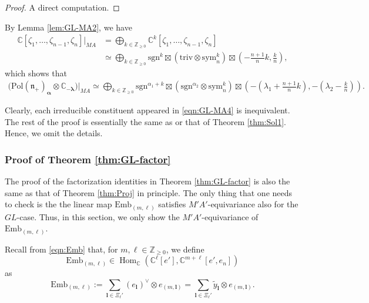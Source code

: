 \documentclass[reqno,11pt]{amsart}
\theoremstyle{remark}
\theoremstyle{definition}
\numberwithin{equation}{section}
\newcommand{\ga}{\alpha}
\newcommand{\fn}{{\mathfrak n}}
\newcommand{\C}{\mathbb{C}}
\newcommand{\Z}{\mathbb{Z}}
\newcommand{\Hom}{\operatorname{Hom}}
\newcommand{\Pol}{\mathrm{Pol}}
\newcommand{\triv}{\mathrm{triv}}
\newcommand{\sym}{\mathrm{sym}}
\newcommand{\sgn}{\mathrm{sgn}}
\newcommand{\balpha}{\bm{\alpha}}
\newcommand{\blambda}{\bm{\lambda}}
\newcommand{\Emb}{\mathrm{Emb}}
\newcommand{\wy}{\widetilde{y}}
\begin{document}
\begin{proof}
A direct computation.
\end{proof}


By  Lemma \ref{lem:GL-MA2}, we have
\begin{align}\label{eqn:MA3}
\C[\zeta_1, \ldots, \zeta_{n-1},\zeta_n]\vert_{MA}
&=
\bigoplus_{k \in \Z_{\geq 0}} 
\C^k[\zeta_1,\ldots,\zeta_{n-1}, \zeta_n]\nonumber\\
&\simeq
\bigoplus_{k \in \Z_{\geq 0}} 
\sgn^{k}\boxtimes(\triv\otimes\sym^k_{n}) \boxtimes 
(-\tfrac{n+1}{n}k, \tfrac{k}{n}),
\end{align}
which shows that
\begin{align}\label{eqn:GL-MA4}
\big(\Pol(\fn_+)_{\balpha}
\otimes \C_{-\blambda}\big)\vert_{MA} 
\simeq 
\bigoplus_{k \in \Z_{\geq 0}} 
\sgn^{\ga_1+k}\boxtimes(\sgn^{\ga_2}\otimes\sym^k_{n}) \boxtimes 
(-(\lambda_1+\tfrac{n+1}{n}k), -(\lambda_2-\tfrac{k}{n})).
\end{align}

Clearly, each irreducible constituent appeared in \eqref{eqn:GL-MA4} is 
inequivalent. The rest of the proof is essentially the same as 
\cite[Sect.\ 5]{KuOr24} or that of Theorem \ref{thm:Sol1}. 
Hence, we omit the details. 


\subsubsection{
Proof of Theorem \ref{thm:GL-factor}
}
\label{sec:GL-proof3}

The proof of the factorization identities in Theorem \ref{thm:GL-factor}
is also the same as that of Theorem \ref{thm:Proj} in principle.
The only thing that one needs to check is the 
the linear map $\Emb_{(m,\ell)}$ satisfies $M'A'$-equivariance 
also for the $GL$-case. Thus, in this section, we only show
the $M'A'$-equivariance of $\Emb_{(m,\ell)}$.

Recall from \eqref{eqn:Emb} that, for $m,\ell \in \Z_{\geq 0}$, we define
\begin{equation*}
\Emb_{(m,\ell)} \in \Hom_{\C}(\C^\ell[e'], \C^{m+\ell}[e',e_n])
\end{equation*}
as
\begin{equation*}
\Emb_{(m,\ell)} 
:= \sum_{\mathbf{l}\in\Xi_{\ell}'}
(e_{\mathbf{l}})^\vee \otimes e_{(m,\mathbf{l})}
= \sum_{\mathbf{l}\in\Xi_{\ell}'}
\wy_{\mathbf{l}} \otimes e_{(m,\mathbf{l})}.
\end{equation*}
\end{document}
